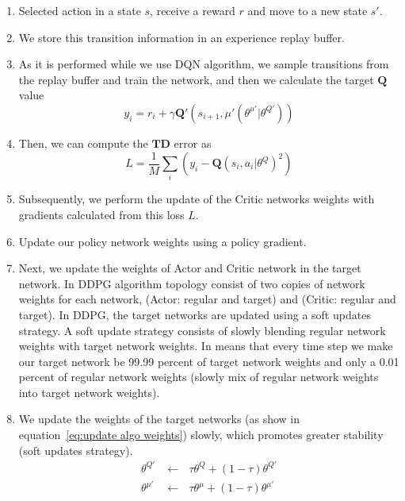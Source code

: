 \begin{enumerate}
    \item Selected action in a state $s$, receive a reward $r$ and move to a new state $s'$.
    \item We store this transition information in an experience replay buffer.
    \item As it is performed while we use DQN algorithm, we sample transitions from the replay buffer and train the network, and then we calculate the target $\mathbf{Q}$ value
    \begin{equation}
        \label{eq:Target Q value}
        y_i = r_i + \gamma \mathbf{Q}' \left( s_{i+1}, \mu'\left( \theta^{\mu'} | \theta^{Q'} \right) \right)
    \end{equation}
    \item Then, we can compute the $\mathbf{T}\mathbf{D}$ error as
    \begin{equation}
        \label{eq:Loss}
        L = \frac{1}{M} \sum_{i}\left( y_i - \mathbf{Q}\left( s_i, a_i | \theta^Q \right)^2 \right)
    \end{equation}
    \item Subsequently, we perform the update of the Critic networks weights with gradients calculated from this loss $L$.
    \item Update our policy network weights using a policy gradient.
    \item Next, we update the weights of Actor and Critic network in the target network. In DDPG algorithm topology consist of two copies of network weights for each network, (Actor: regular and target) and (Critic: regular and target). In DDPG, the target networks are updated using a soft updates strategy. A soft update strategy consists of slowly blending regular network weights with target network weights. In means that every time step we make our target network be 99.99 percent of target network weights and only a 0.01 percent of regular network weights (slowly mix of regular network weights into target network weights).
    \item We update the weights of the target networks (as show in equation~\ref{eq:update algo weights}) slowly, which promotes greater stability (soft updates strategy).
    \begin{equation}
        \label{eq:update algo weights}
        \begin{aligned}
            \theta^{Q'} & \gets \text{ } \tau \theta^Q + (1- \tau) \theta^{Q'} \\
            \theta^{\mu'} & \gets \text{ } \tau \theta^\mu + (1- \tau) \theta^{\mu'}
        \end{aligned}
    \end{equation}
\end{enumerate}

